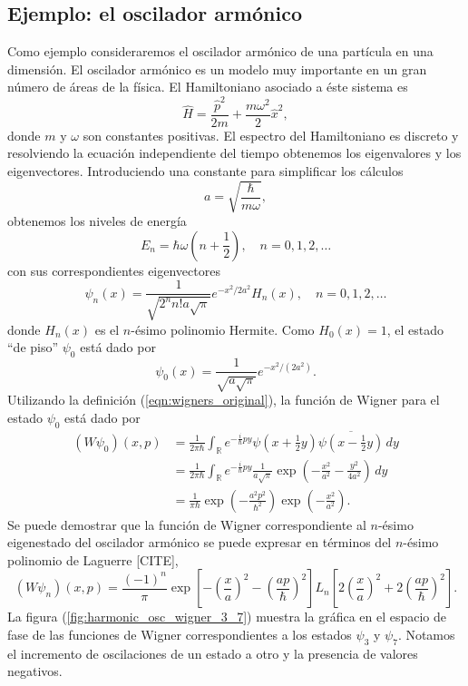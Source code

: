 \documentclass[a4paper]{report}
\DeclareMathOperator{\R}{\mathbb{R}}
\begin{document}
  \subsection{Ejemplo: el oscilador armónico}

  Como ejemplo consideraremos el oscilador armónico de una
  partícula en una dimensión. El oscilador armónico es un
  modelo muy importante en un gran número de áreas de la
  física.  El Hamiltoniano asociado a éste sistema es
  \begin{equation}
    \hat{H}
    = \frac{\hat{p}^2}{2m} + \frac{m\omega^2}{2}
    \hat{x}^2,
  \end{equation}
  donde $m$ y $\omega$ son constantes positivas. El espectro
  del Hamiltoniano es discreto y resolviendo la ecuación
  independiente del tiempo obtenemos los eigenvalores y los
  eigenvectores. Introduciendo una constante para
  simplificar los cálculos
  \[
    a = \sqrt{\frac{\hbar}{m \omega}},
  \]
  obtenemos los niveles de energía
  \begin{equation}
    E_n
    = \hbar \omega \left( n + \frac{1}{2} \right),
    \quad n = 0,1,2,\ldots
  \end{equation}
  con sus correspondientes eigenvectores
  \begin{equation}
    \psi_n(x)
    = \frac{1}{\sqrt{2^{n} n! a \sqrt{\pi}}} e^{-x^2 / 2a^2}
    H_n(x),
    \quad n = 0, 1, 2,\ldots
  \end{equation}
  donde $H_n(x)$ es el $n$-ésimo polinomio Hermite.
  Como $H_0(x) = 1$, el estado ``de piso'' $\psi_0$ está
  dado por
  \[
    \psi_0(x)
    = \frac{1}{\sqrt{a \sqrt{\pi}}} e^{-x^2 / (2a^2)}.
  \]
  Utilizando la definición (\ref{eqn:wigners_original}), la
  función de Wigner para el estado $\psi_0$ está dado por
  \begin{align*}
    (W\psi_0)(x,p)
    &= \frac{1}{2\pi\hbar} \int_{\R} e^{-\frac{i}{\hbar} p y}
    \psi(x + \tfrac{1}{2}y) \overline{\psi(x -
    \tfrac{1}{2}y)} \, dy \\
    &= \frac{1}{2\pi\hbar} \int_{\R} e^{-\frac{i}{\hbar}py}
    \frac{1}{a\sqrt{\pi}}\exp\left( -\frac{x^2}{a^2} -
    \frac{y^2}{4a^2} \right)  \, dy \\
    &= \frac{1}{\pi\hbar} \exp\left( -\frac{a^2
    p^2}{\hbar^2} \right) \exp\left( -\frac{x^2}{a^2}
    \right). 
  \end{align*}
  Se puede demostrar que la función de Wigner
  correspondiente al $n$-ésimo eigenestado del oscilador
  armónico se puede expresar en términos del $n$-ésimo polinomio
  de Laguerre [CITE], 
  \[
    (W\psi_n)(x,p)
    = \frac{(-1)^{n}}{\pi} \exp\left[ -\left( \frac{x}{a}
    \right)^2 - \left( \frac{ap}{\hbar} \right)^2 \right]
    L_n\left[ 2\left( \frac{x}{a} \right)^2 + 2\left(
    \frac{ap}{\hbar} \right)^2 \right].
  \] 
  La figura (\ref{fig:harmonic_osc_wigner_3_7}) muestra la
  gráfica en el espacio de fase de las funciones de Wigner
  correspondientes a los estados $\psi_3$ y $\psi_7$.
  Notamos el incremento de oscilaciones de un estado a otro
  y la presencia de valores negativos.
  
\end{document}
